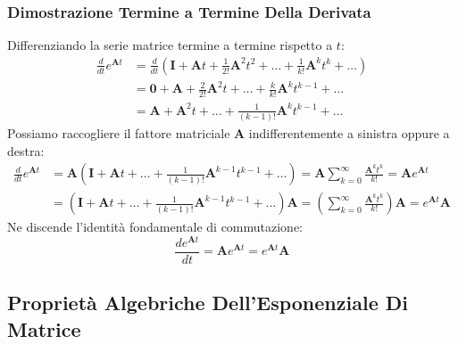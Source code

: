 \documentclass[11pt, a4paper]{article}
\begin{document}
\subsubsection{Dimostrazione Termine a Termine Della Derivata}
Differenziando la serie matrice termine a termine rispetto a $t$:
\begin{align*}
    \frac{d}{dt} e^{\bm{A}t} &= \frac{d}{dt} \left( \bm{I} + \bm{A}t + \frac{1}{2!}\bm{A}^2 t^2 + \dots + \frac{1}{k!}\bm{A}^k t^k + \dots \right) \\
    &= \bm{0} + \bm{A} + \frac{2}{2!}\bm{A}^2 t + \dots + \frac{k}{k!}\bm{A}^k t^{k-1} + \dots \\
    &= \bm{A} + \bm{A}^2 t + \dots + \frac{1}{(k-1)!}\bm{A}^k t^{k-1} + \dots
\end{align*}
Possiamo raccogliere il fattore matriciale $\bm{A}$ indifferentemente a sinistra oppure a destra:
\begin{align*}
    \frac{d}{dt} e^{\bm{A}t} &= \bm{A} \left( \bm{I} + \bm{A}t + \dots + \frac{1}{(k-1)!}\bm{A}^{k-1}t^{k-1} + \dots \right) = \bm{A} \sum_{k=0}^\infty \frac{\bm{A}^k t^k}{k!} = \bm{A} e^{\bm{A}t} \\
    &= \left( \bm{I} + \bm{A}t + \dots + \frac{1}{(k-1)!}\bm{A}^{k-1}t^{k-1} + \dots \right) \bm{A} = \left(\sum_{k=0}^\infty \frac{\bm{A}^k t^k}{k!}\right) \bm{A} = e^{\bm{A}t} \bm{A}
\end{align*}
Ne discende l'identità fondamentale di commutazione:
\[
    \boxed{\frac{d e^{\bm{A}t}}{dt} = \bm{A} e^{\bm{A}t} = e^{\bm{A}t} \bm{A}}
\]

\subsection{Proprietà Algebriche Dell'Esponenziale Di Matrice}
\end{document}
